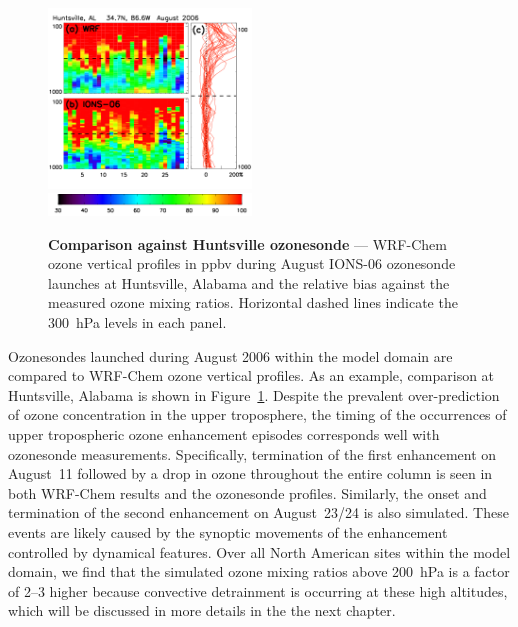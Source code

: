 \begin{figure}
	\centering
	\begin{singlespacing}
 \noindent\includegraphics[width=0.48\textwidth]{Figures/o3/ions_huntsville.png} \\
 \noindent\includegraphics[width=0.48\textwidth]{Figures/o3/o3_colorbar.png}
	\caption[Comparison against Huntsville ozonesonde]{{\small\textbf{Comparison against Huntsville ozonesonde} ---
	WRF-Chem ozone vertical profiles in ppbv during August IONS-06 ozonesonde launches at Huntsville, Alabama and
	the relative bias against the measured ozone mixing ratios. Horizontal dashed lines indicate the 300~hPa levels in each panel.}}
	\label{fig:huntsville}
	\end{singlespacing}
\end{figure}

Ozonesondes launched during August 2006 within the model domain are compared
to WRF-Chem ozone vertical profiles. As an example, comparison at Huntsville, Alabama
is shown in Figure~\ref{fig:huntsville}. Despite the prevalent over-prediction of ozone
concentration in the upper troposphere, the timing of the occurrences of upper
tropospheric ozone enhancement episodes corresponds well with ozonesonde
measurements. Specifically, termination of the first enhancement on August~11
followed by a drop in ozone throughout the entire column is seen in both WRF-Chem
results and the ozonesonde profiles. Similarly, the onset and termination of the second
enhancement on August~23/24  is also simulated. These events are likely caused by
the synoptic movements of the enhancement controlled by dynamical features. Over
all North American sites within the model domain, we find that the simulated ozone
mixing ratios above 200~hPa is a factor of 2--3 higher because convective detrainment
is occurring at these high altitudes, which will be discussed in more details in the the next chapter.

